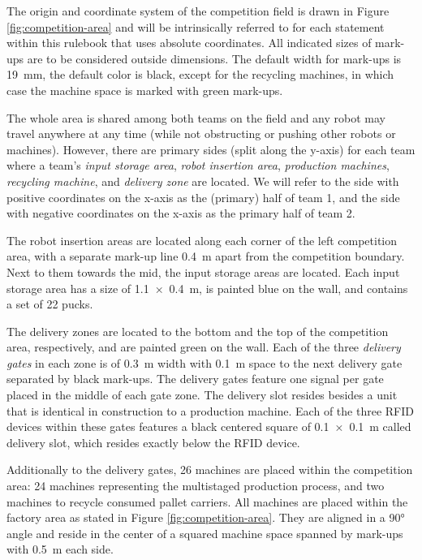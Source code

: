 \documentclass[12pt,twoside]{article}
\begin{document}
The origin and coordinate system of the competition field is drawn in
Figure \ref{fig:competition-area} and will be intrinsically referred
to for each statement within this rulebook that uses absolute
coordinates. All indicated sizes of mark-ups are to be considered
outside dimensions. The default width for mark-ups is
\SI{19}{\milli\metre}, the default color is black, except for the
recycling machines, in which case the machine space is marked with
green mark-ups.

The whole area is shared among both teams on the field and any robot
may travel anywhere at any time (while not obstructing or pushing
other robots or machines). However, there are primary sides (split
along the y-axis) for each team where a team's \textit{input storage
  area}, \textit{robot insertion area}, \textit{production machines},
\textit{recycling machine}, and \textit{delivery zone} are located. We
will refer to the side with positive coordinates on the x-axis as the
(primary) half of team 1, and the side with negative coordinates on
the x-axis as the primary half of team 2.

The robot insertion areas are located along each corner of the left
competition area, with a separate mark-up line \SI{0.4}{\metre} apart
from the competition boundary.  Next to them towards the mid, the
input storage areas are located. Each input storage area has a size of
\SI{1.1 x 0.4}{\metre}, is painted blue on the wall, and contains a
set of 22 pucks.

The delivery zones are located to the bottom and the top of the
competition area, respectively, and are painted green on the
wall. Each of the three \textit{delivery gates} in each zone is of
\SI{0.3}{\metre} width with \SI{0.1}{\metre} space to the next
delivery gate separated by black mark-ups. The delivery gates feature
one signal per gate placed in the middle of each gate zone. The
delivery slot resides besides a unit that is identical in construction
to a production machine. Each of the three RFID devices within these
gates features a black centered square of \SI{0.1 x 0.1}{\metre} called
delivery slot, which resides exactly below the RFID device.

Additionally to the delivery gates, 26 machines are placed within the
competition area: 24 machines representing the multistaged production
process, and two machines to recycle consumed pallet carriers. All
machines are placed within the factory area as stated in Figure
\ref{fig:competition-area}. They are aligned in a \ang{90} angle and
reside in the center of a squared machine space spanned by mark-ups
with \SI{0.5}{\metre} each side.
\end{document}
